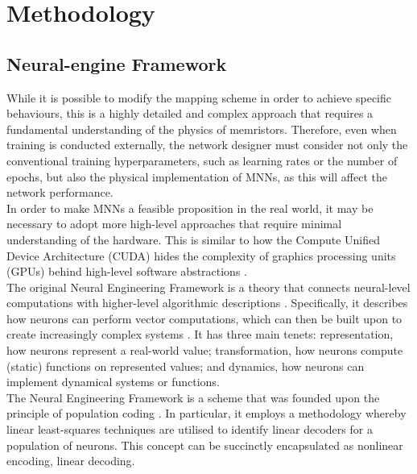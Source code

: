\section[Methodology]{Methodology}

\subsection[Neural-engine Framework]{Neural-engine Framework}

\noindent While it is possible to modify the mapping scheme in order to achieve specific behaviours, this is a highly detailed and complex approach that requires a fundamental understanding of the physics of memristors. Therefore, even when training is conducted externally, the network designer must consider not only the conventional training hyperparameters, such as learning rates or the number of epochs, but also the physical implementation of MNNs, as this will affect the network performance. \\

\noindent In order to make MNNs a feasible proposition in the real world, it may be necessary to adopt more high-level approaches that require minimal understanding of the hardware. This is similar to how the Compute Unified Device Architecture (CUDA) hides the complexity of graphics processing units (GPUs) behind high-level software abstractions \cite{el2008performance}.\\

\noindent The original Neural Engineering Framework is a theory that connects neural-level computations with higher-level algorithmic descriptions \cite{eliasmith2003neural}. Specifically, it describes how neurons can perform vector computations, which can then be built upon to create increasingly complex systems \cite{eliasmith2012large}. It has three main tenets: representation, how neurons represent a real-world value; transformation, how neurons compute (static) functions on represented values; and dynamics, how neurons can implement dynamical systems or functions. \\

\noindent The Neural Engineering Framework is a scheme that was founded upon the principle of population coding \cite{salinas1994vector}. In particular, it employs a methodology whereby linear least-squares techniques are utilised to identify linear decoders for a population of neurons. This concept can be succinctly encapsulated as nonlinear encoding, linear decoding. \\

